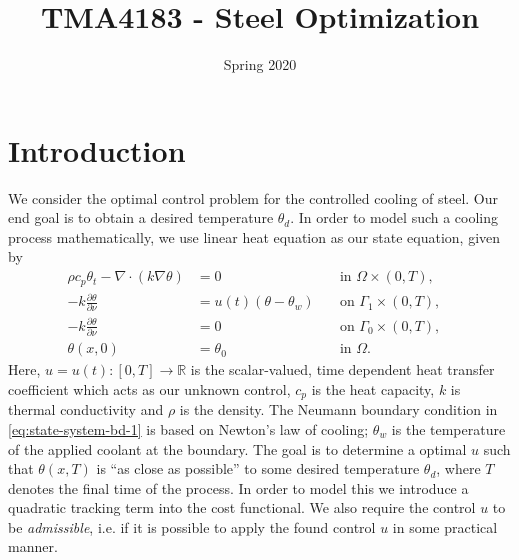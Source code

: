 \documentclass{article}
\title{TMA4183 - Steel Optimization}
\author{}
\date{Spring 2020}
\begin{document}
\maketitle

\section{Introduction}
We consider the optimal control problem for the controlled cooling of steel. Our end goal is to obtain a desired temperature $\theta_d$. In order to model such a cooling process mathematically, we use linear heat equation as our state equation, given by
\begin{subequations}
   \label{eq:heat}
   \begin{align}
      \rho c_p \theta_t - \nabla \cdot (k \nabla \theta) &= 0 \quad &\text{in } \Omega \times (0,T),\label{eq:heat-in-omega} \\
      -k \frac{\partial \theta}{\partial \nu} &= u(t) (\theta - \theta_w) \quad &\text{on } \Gamma_1 \times (0,T), \label{eq:state-system-bd-1} \\
      -k \frac{\partial \theta}{\partial \nu} &= 0 \quad &\text{on } \Gamma_0 \times (0,T), \label{eq:state-system-bd-2} \\
      \theta(x, 0) &= \theta_0 &\text{in } \Omega. &
   \end{align}
\end{subequations}
Here, $u = u(t) \colon [0, T] \to \mathbb{R}$ is the scalar-valued, time dependent heat transfer coefficient which acts as our unknown control, $c_p$ is the heat capacity, $k$ is thermal conductivity and $\rho$ is the density. The Neumann boundary condition in \eqref{eq:state-system-bd-1} is based on Newton's law of cooling; $\theta_w$ is the temperature of the applied coolant at the boundary. The goal is to determine a optimal $u$ such that $\theta(x, T)$ is ``as close as possible'' to some desired temperature $\theta_d$, where $T$ denotes the final time of the process. In order to model this we introduce a quadratic tracking term into the cost functional. We also require the control $u$ to be \emph{admissible}, i.e. if it is possible to apply the found control $u$ in some practical manner.
\end{document}
